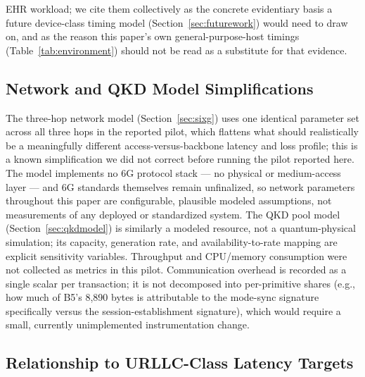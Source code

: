 \documentclass[journal]{IEEEtran}
\begin{document}
EHR workload; we cite them collectively as the concrete evidentiary basis a future device-class timing model (Section~\ref{sec:futurework}) would need to draw on, and as the reason this paper's own general-purpose-host timings (Table~\ref{tab:environment}) should not be read as a substitute for that evidence.

\subsection{Network and QKD Model Simplifications}

The three-hop network model (Section~\ref{sec:sixg}) uses one identical parameter set across all three hops in the reported pilot, which flattens what should realistically be a meaningfully different access-versus-backbone latency and loss profile; this is a known simplification we did not correct before running the pilot reported here. The model implements no 6G protocol stack --- no physical or medium-access layer --- and 6G standards themselves remain unfinalized, so network parameters throughout this paper are configurable, plausible modeled assumptions, not measurements of any deployed or standardized system. The QKD pool model (Section~\ref{sec:qkdmodel}) is similarly a modeled resource, not a quantum-physical simulation; its capacity, generation rate, and availability-to-rate mapping are explicit sensitivity variables. Throughput and CPU/memory consumption were not collected as metrics in this pilot. Communication overhead is recorded as a single scalar per transaction; it is not decomposed into per-primitive shares (e.g., how much of B5's 8{,}890 bytes is attributable to the mode-sync signature specifically versus the session-establishment signature), which would require a small, currently unimplemented instrumentation change.

\subsection{Relationship to URLLC-Class Latency Targets}
\end{document}

